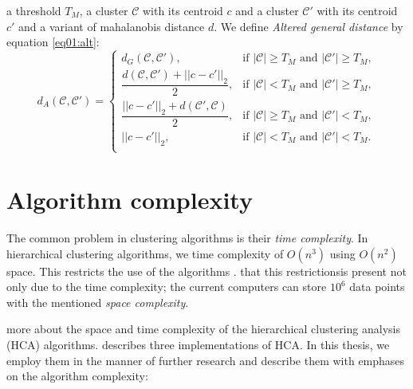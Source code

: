 \begin{defn}[???]
	 a threshold $T_M$, a cluster $\mathcal{C}$ with its centroid $c$ and a cluster $\mathcal{C}'$ with its centroid $c'$ and a variant of mahalanobis distance $d$. We define \emph{Altered general distance} by equation \ref{eq01:alt}:
	\begin{equation}
	d_A(\mathcal{C},\mathcal{C}')=
	\begin{cases}
	d_G(\mathcal{C}, \mathcal{C}'), & \text{if $|\mathcal{C}|\ge T_M$ and $|\mathcal{C}'|\ge T_M$},\\
	\dfrac{d(\mathcal{C}, \mathcal{C}')+||c-c'||_2}{2}, & \text{if $|\mathcal{C}| < T_M$ and $|\mathcal{C}'|\ge T_M$},\\
	\dfrac{||c-c'||_2+d(\mathcal{C}', \mathcal{C})}{2}, & \text{if $|\mathcal{C}|\ge T_M$ and $|\mathcal{C}'|< T_M$},\\
	||c-c'||_2, & \text{if $|\mathcal{C}|< T_M$ and $|\mathcal{C}'|< T_M$}.\\
	\end{cases}
	\label{eq01:alt}
	\end{equation}
	\label{def01:alt}
\end{defn}



\section{Algorithm complexity}

The common problem in clustering algorithms is their \emph{time complexity}. In hierarchical clustering algorithms, we  time complexity of $O(n^3)$ using $O(n^2)$ space. This restricts the use of the algorithms .  that this restrictionsis present not only due to the time complexity; the current computers can  store $10^6$ data points with the mentioned \emph{space complexity}.

 more about the space and time complexity of the hierarchical clustering analysis (HCA) algorithms. \citet{day1984efficient} describes three implementations of HCA. In this thesis, we employ them in the manner of further research and describe them with emphases on the algorithm complexity:

